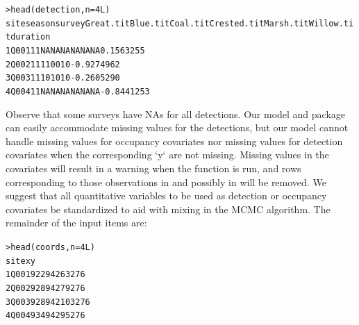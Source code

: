 \begin{alltt}
> head(detection, n=4L)
  site season survey Great.tit Blue.tit Coal.tit Crested.tit Marsh.tit Willow.tit   duration
1 Q001      1      1        NA       NA       NA          NA        NA         NA  0.1563255
2 Q002      1      1         1        1        0           0         1          0 -0.9274962
3 Q003      1      1         1        0        1           0         1          0 -0.2605290
4 Q004      1      1        NA       NA       NA          NA        NA         NA -0.8441253
\end{alltt}
Observe that some surveys have NAs for all detections.  Our model and package can easily accommodate missing values for the detections, but our model cannot handle missing values for occupancy covariates nor missing values for detection covariates when the corresponding `y` are not missing. Missing values in the covariates will result in a warning when the  function is run, and rows corresponding to those observations in  and possibly in  will be removed. We suggest that all quantitative variables to be used as detection or occupancy covariates be standardized to aid with mixing in the MCMC algorithm.  The remainder of the input items are:  

\begin{alltt}
> head(coords, n=4L)
  site      x      y
1 Q001 922942  63276
2 Q002 928942  79276
3 Q003 928942 103276
4 Q004 934942  95276
\end{alltt}

